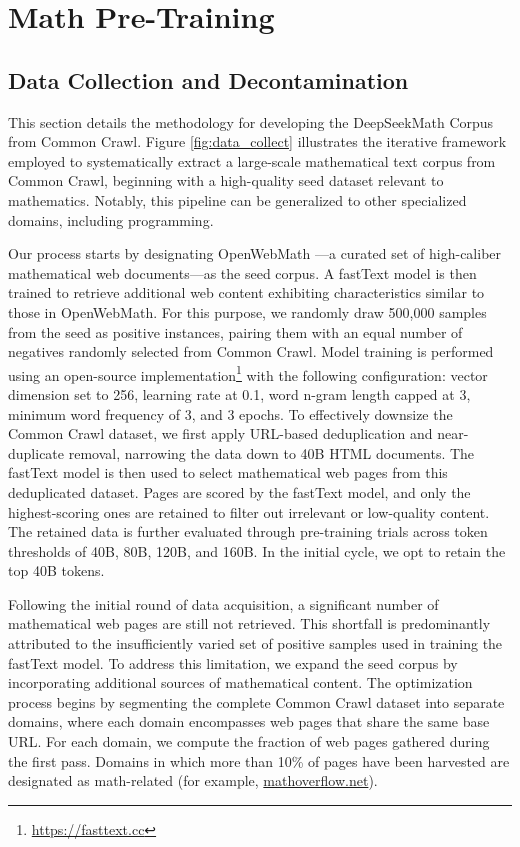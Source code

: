 \section{Math Pre-Training}

\subsection{Data Collection and Decontamination}
This section details the methodology for developing the DeepSeekMath Corpus from Common Crawl. Figure \ref{fig:data_collect} illustrates the iterative framework employed to systematically extract a large-scale mathematical text corpus from Common Crawl, beginning with a high-quality seed dataset relevant to mathematics. Notably, this pipeline can be generalized to other specialized domains, including programming.

Our process starts by designating OpenWebMath \citep{openwebmath}—a curated set of high-caliber mathematical web documents—as the seed corpus. A fastText model \citep{joulin2016fasttext} is then trained to retrieve additional web content exhibiting characteristics similar to those in OpenWebMath. For this purpose, we randomly draw 500,000 samples from the seed as positive instances, pairing them with an equal number of negatives randomly selected from Common Crawl. Model training is performed using an open-source implementation\footnote{\url{https://fasttext.cc}} with the following configuration: vector dimension set to 256, learning rate at 0.1, word n-gram length capped at 3, minimum word frequency of 3, and 3 epochs. To effectively downsize the Common Crawl dataset, we first apply URL-based deduplication and near-duplicate removal, narrowing the data down to 40B HTML documents. The fastText model is then used to select mathematical web pages from this deduplicated dataset. Pages are scored by the fastText model, and only the highest-scoring ones are retained to filter out irrelevant or low-quality content. The retained data is further evaluated through pre-training trials across token thresholds of 40B, 80B, 120B, and 160B. In the initial cycle, we opt to retain the top 40B tokens.

Following the initial round of data acquisition, a significant number of mathematical web pages are still not retrieved. This shortfall is predominantly attributed to the insufficiently varied set of positive samples used in training the fastText model. To address this limitation, we expand the seed corpus by incorporating additional sources of mathematical content. The optimization process begins by segmenting the complete Common Crawl dataset into separate domains, where each domain encompasses web pages that share the same base URL. For each domain, we compute the fraction of web pages gathered during the first pass. Domains in which more than 10\% of pages have been harvested are designated as math-related (for example, \url{mathoverflow.net}). 

